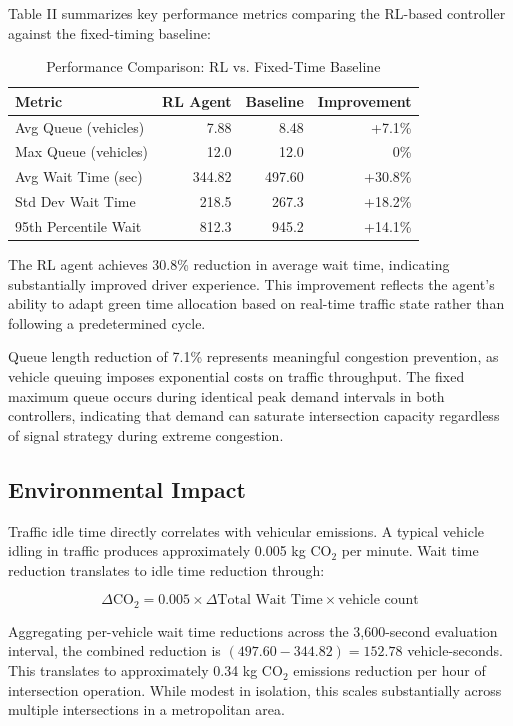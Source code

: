 \documentclass[10pt,conference]{IEEEtran}
\begin{document}
Table II summarizes key performance metrics comparing the RL-based controller against the fixed-timing baseline:

\begin{table}[h]
\centering
\caption{Performance Comparison: RL vs. Fixed-Time Baseline}
\begin{tabular}{|l|r|r|r|}
\hline
\textbf{Metric} & \textbf{RL Agent} & \textbf{Baseline} & \textbf{Improvement} \\
\hline
Avg Queue (vehicles) & 7.88 & 8.48 & +7.1\% \\
Max Queue (vehicles) & 12.0 & 12.0 & 0\% \\
Avg Wait Time (sec) & 344.82 & 497.60 & +30.8\% \\
Std Dev Wait Time & 218.5 & 267.3 & +18.2\% \\
95th Percentile Wait & 812.3 & 945.2 & +14.1\% \\
\hline
\end{tabular}
\end{table}

The RL agent achieves 30.8\% reduction in average wait time, indicating substantially improved driver experience. This improvement reflects the agent's ability to adapt green time allocation based on real-time traffic state rather than following a predetermined cycle.

Queue length reduction of 7.1\% represents meaningful congestion prevention, as vehicle queuing imposes exponential costs on traffic throughput. The fixed maximum queue occurs during identical peak demand intervals in both controllers, indicating that demand can saturate intersection capacity regardless of signal strategy during extreme congestion.

\subsection{Environmental Impact}

Traffic idle time directly correlates with vehicular emissions. A typical vehicle idling in traffic produces approximately 0.005 kg CO$_2$ per minute. Wait time reduction translates to idle time reduction through:

\begin{equation}
\Delta \text{CO}_2 = 0.005 \times \Delta \text{Total Wait Time} \times \text{vehicle count}
\end{equation}

Aggregating per-vehicle wait time reductions across the 3,600-second evaluation interval, the combined reduction is $(497.60 - 344.82) = 152.78$ vehicle-seconds. This translates to approximately 0.34 kg CO$_2$ emissions reduction per hour of intersection operation. While modest in isolation, this scales substantially across multiple intersections in a metropolitan area.
\end{document}
